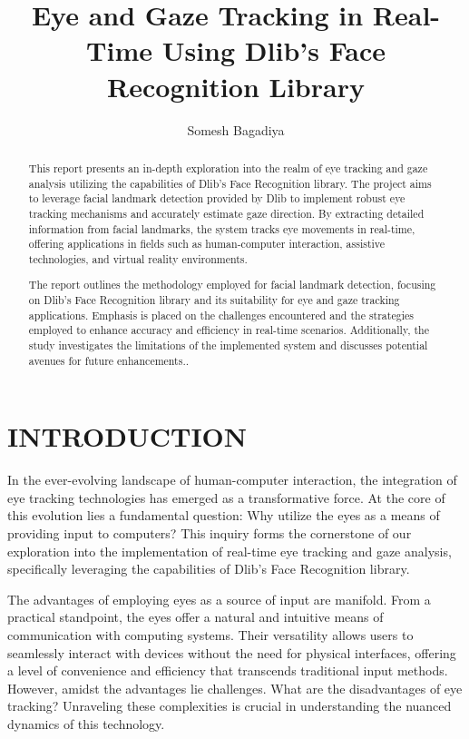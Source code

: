 \documentclass[letterpaper, 10 pt, conference]{ieeeconf}  %
\title{\LARGE \bf
Eye and Gaze Tracking in Real-Time Using Dlib's Face Recognition Library
}
\author{Somesh Bagadiya}
\begin{document}
\maketitle
\thispagestyle{empty}
\pagestyle{empty}


\begin{abstract}

This report presents an in-depth exploration into the realm of eye tracking and gaze analysis utilizing the capabilities of Dlib's Face Recognition library. The project aims to leverage facial landmark detection provided by Dlib to implement robust eye tracking mechanisms and accurately estimate gaze direction. By extracting detailed information from facial landmarks, the system tracks eye movements in real-time, offering applications in fields such as human-computer interaction, assistive technologies, and virtual reality environments.

The report outlines the methodology employed for facial landmark detection, focusing on Dlib's Face Recognition library and its suitability for eye and gaze tracking applications. Emphasis is placed on the challenges encountered and the strategies employed to enhance accuracy and efficiency in real-time scenarios. Additionally, the study investigates the limitations of the implemented system and discusses potential avenues for future enhancements..

\end{abstract}


\section{INTRODUCTION}

In the ever-evolving landscape of human-computer interaction, the integration of eye tracking technologies has emerged as a transformative force. At the core of this evolution lies a fundamental question: Why utilize the eyes as a means of providing input to computers? This inquiry forms the cornerstone of our exploration into the implementation of real-time eye tracking and gaze analysis, specifically leveraging the capabilities of Dlib's Face Recognition library.

The advantages of employing eyes as a source of input are manifold. From a practical standpoint, the eyes offer a natural and intuitive means of communication with computing systems. Their versatility allows users to seamlessly interact with devices without the need for physical interfaces, offering a level of convenience and efficiency that transcends traditional input methods. However, amidst the advantages lie challenges. What are the disadvantages of eye tracking? Unraveling these complexities is crucial in understanding the nuanced dynamics of this technology.
\end{document}
